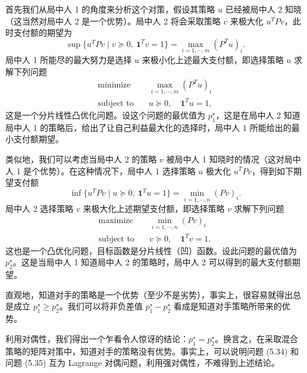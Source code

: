 \documentclass[UTF8,12pt,a4paper,fontset=fandol]{ctexart}
\begin{document}
首先我们从局中人 1 的角度来分析这个对策，假设其策略 $u$ 已经被局中人 2 知晓（这当然对局中人 2 是一个优势）。局中人 2 将会采取策略 $v$ 来极大化 $u^TPv$，此时支付额的期望为
\[
\sup\{u^TPv\mid v\succeq 0,\ \mathbf{1}^Tv=1\}
=\max_{i=1,\cdots,m}(P^Tu)_i.
\]
局中人 1 所能尽的最大努力是选择 $u$ 来极小化上述最大支付额，即选择策略 $u$ 求解下列问题
\begin{equation}
\begin{aligned}
\text{minimize}\quad & \max_{i=1,\cdots,m}(P^Tu)_i\\
\text{subject to}\quad & u\succeq 0,\quad \mathbf{1}^Tu=1,
\end{aligned}
\tag{5.34}
\end{equation}
这是一个分片线性凸优化问题。设这个问题的最优值为 $p_1^\star$，这是在局中人 2 知道局中人 1 的策略后，给出了让自己利益最大化的选择时，局中人 1 所能给出的最小支付额期望。

类似地，我们可以考虑当局中人 2 的策略 $v$ 被局中人 1 知晓时的情况（这对局中人 1 是个优势）。在这种情况下，局中人 1 选择策略 $u$ 极大化 $u^TPv$，得到如下期望支付额
\[
\inf\{u^TPv\mid u\succeq 0,\ \mathbf{1}^Tu=1\}
=\min_{i=1,\cdots,n}(Pv)_i.
\]
局中人 2 选择策略 $v$ 来极大化上述期望支付额，即选择策略 $v$ 求解下列问题
\begin{equation}
\begin{aligned}
\text{maximize}\quad & \min_{i=1,\cdots,n}(Pv)_i\\
\text{subject to}\quad & v\succeq 0,\quad \mathbf{1}^Tv=1,
\end{aligned}
\tag{5.35}
\end{equation}
这也是一个凸优化问题，目标函数是分片线性（凹）函数。设此问题的最优值为 $p_2^\star$。这是当局中人 1 知道局中人 2 的策略时，局中人 2 可以得到的最大支付额期望。

直观地，知道对手的策略是一个优势（至少不是劣势），事实上，很容易就得出总是成立 $p_1^\star\geq p_2^\star$。我们可以将非负差值 $p_1^\star-p_2^\star$ 看成是知道对手策略所带来的优势。

利用对偶性，我们得出一个乍看令人惊讶的结论：$p_1^\star=p_2^\star$。换言之，在采取混合策略的矩阵对策中，知道对手的策略没有优势。事实上，可以说明问题 (5.34) 和问题 (5.35) 互为 Lagrange 对偶问题，利用强对偶性，不难得到上述结论。
\end{document}

